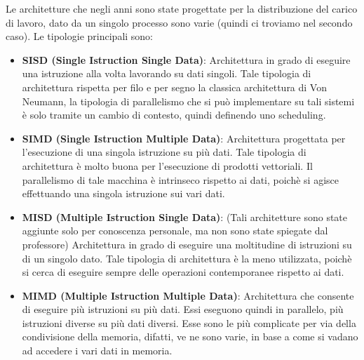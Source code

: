 Le architetture che negli anni sono state progettate per la distribuzione del carico di lavoro, dato da un singolo processo sono varie (quindi ci troviamo nel secondo caso).
Le tipologie principali sono:
\begin{itemize}
    \item \textbf{SISD (Single Istruction Single Data)}: Architettura in grado di eseguire una istruzione alla volta lavorando su dati singoli. Tale tipologia di architettura rispetta per filo e per segno la classica architettura di Von Neumann, la tipologia di parallelismo che si può implementare su tali sistemi è solo tramite un cambio di contesto, quindi definendo uno scheduling.
    \item \textbf{SIMD (Single Istruction Multiple Data)}: Architettura progettata per l'esecuzione di una singola istruzione su più dati. Tale tipologia di architettura è molto buona per l'esecuzione di prodotti vettoriali. Il parallelismo di tale macchina è intrinseco rispetto ai dati, poichè si agisce effettuando una singola istruzione sui vari dati.
    \item \textbf{MISD (Multiple Istruction Single Data)}: (Tali architetture sono state aggiunte solo per conoscenza personale, ma non sono state spiegate dal professore) Architettura in grado di eseguire una moltitudine di istruzioni su di un singolo dato. Tale tipologia di architettura è la meno utilizzata, poichè si cerca di eseguire sempre delle operazioni contemporanee rispetto ai dati.
    \item \textbf{MIMD (Multiple Istruction Multiple Data)}: Architettura che consente di eseguire più istruzioni su più dati. Essi eseguono quindi in parallelo, più istruzioni diverse su più dati diversi. Esse sono le più complicate per via della condivisione della memoria, difatti, ve ne sono varie, in base a come si vadano ad accedere i vari dati in memoria.
\end{itemize}

